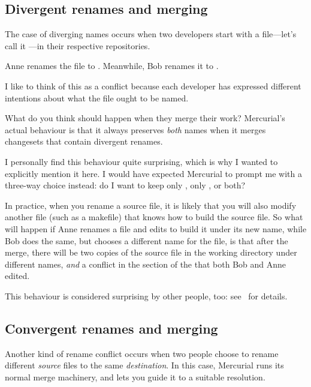\subsection{Divergent renames and merging}

The case of diverging names occurs when two developers start with a
file---let's call it ---in their respective
repositories.

Anne renames the file to .
Meanwhile, Bob renames it to .

I like to think of this as a conflict because each developer has
expressed different intentions about what the file ought to be named.

What do you think should happen when they merge their work?
Mercurial's actual behaviour is that it always preserves \emph{both}
names when it merges changesets that contain divergent renames.

I personally find this behaviour quite surprising, which is why I
wanted to explicitly mention it here.  I would have expected Mercurial
to prompt me with a three-way choice instead: do I want to keep only
, only , or both?

In practice, when you rename a source file, it is likely that you will
also modify another file (such as a makefile) that knows how to build
the source file.  So what will happen if Anne renames a file and edits
 to build it under its new name, while Bob does the
same, but chooses a different name for the file, is that after the
merge, there will be two copies of the source file in the working
directory under different names, \emph{and} a conflict in the section
of the  that both Bob and Anne edited.

This behaviour is considered surprising by other people, too:
see~ for details.

\subsection{Convergent renames and merging}

Another kind of rename conflict occurs when two people choose to
rename different \emph{source} files to the same \emph{destination}.
In this case, Mercurial runs its normal merge machinery, and lets you
guide it to a suitable resolution.

